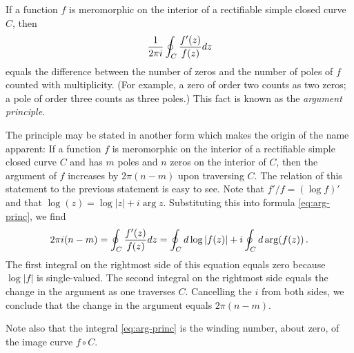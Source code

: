 \documentclass[12pt]{article}
\begin{document}

If a function $f$ is meromorphic on the interior of a rectifiable simple closed curve $C$, then
\begin{align}\label{eq:arg-princ}
{1 \over 2 \pi i} \oint_C {f'(z) \over f(z)} dz
\end{align}
equals the difference between the number of zeros and the number of poles of $f$ counted with multiplicity. (For example, a zero of order two counts as two zeros; a pole of order three counts as three poles.)
This fact is known as the \emph{argument principle}.

The principle may be stated in another form which makes the origin of the name apparent:  If a function $f$ is meromorphic on the interior of a rectifiable simple closed curve $C$ and has $m$ poles and $n$ zeros on the interior of $C$, then the argument of $f$ increases by $2 \pi (n - m)$ upon traversing $C$.  The relation of this statement to the previous statement is easy to see.  Note that $f'/f = (\log f)'$ and that $\log (z) = \log |z| + i \arg z$.  Substituting this into formula \eqref{eq:arg-princ}, we find
\[
2 \pi i (n - m) = \oint_C {f'(z) \over f(z)} dz = \oint_C d \log |f(z)| +  i \oint_C d \arg (f(z))\,.
\]
The first integral on the rightmost side of this equation equals zero because $\log|f|$ is single-valued.  The second integral on the rightmost side equals the change in the argument as one traverses $C$.  Cancelling the $i$ from both sides, we conclude that the change in the argument equals $2 \pi (n - m)$.

Note also that the integral \eqref{eq:arg-princ}
is the winding number, about zero, of the image curve $f \circ C$.


\end{document}
